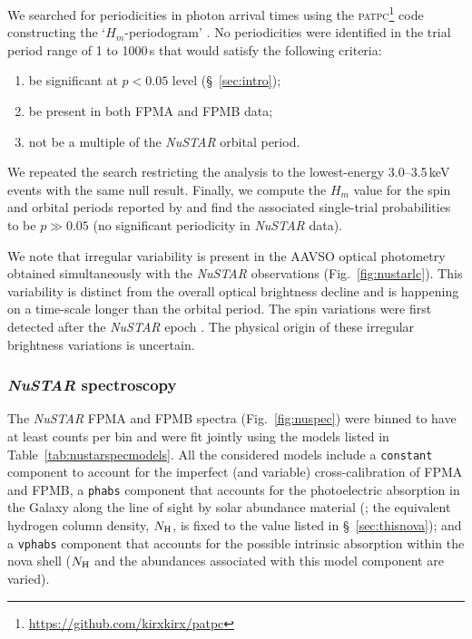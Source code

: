 \documentclass[a4paper,fleqn,usenatbib]{mnras}
\begin{document}
We searched for periodicities in photon arrival times using 
the \textsc{patpc}\footnote{\url{https://github.com/kirxkirx/patpc}} code 
\citep{2022arXiv220610625S} constructing the `$H_m$-periodogram' 
\citep{1989A&A...221..180D,2010A&A...517L...9D,2011ApJ...732...38K}.
No periodicities were identified in the trial period range of 1 to 1000\,s
that would satisfy the following criteria:
\begin{enumerate}
\item be significant at $p<0.05$ level (\S~\ref{sec:intro});
\item be present in both FPMA and FPMB data;
\item not be a multiple of the {\em NuSTAR} orbital period.
\end{enumerate}
We repeated the search restricting the analysis to the lowest-energy
3.0--3.5\,keV events with the same null result. 
Finally, we compute the 
$H_m$ value for the spin and orbital periods reported by \cite{2022ApJ...940L..56P} and
find the associated single-trial probabilities to be $p \gg 0.05$ 
(no significant periodicity in {\em NuSTAR} data).

We note that irregular variability is present
in the AAVSO optical photometry obtained simultaneously with the {\em NuSTAR}
observations (Fig.~\ref{fig:nustarlc}). 
This variability is distinct from the overall optical brightness decline 
and is happening on a time-scale longer than the orbital period. 
The spin variations were first detected after the {\em NuSTAR} epoch \citep{2022ApJ...940L..56P}. 
The physical origin of these irregular brightness variations is uncertain.


\subsubsection{{\em NuSTAR} spectroscopy}
\label{sec:nustarspec}



The {\em NuSTAR} FPMA and FPMB spectra (Fig.~\ref{fig:nuspec}) were binned to
have at least \nustargroupmincounts{} counts per bin and were fit jointly
using the models listed in Table~\ref{tab:nustarspecmodels}.
All the considered models include a \texttt{constant} component to account for
the imperfect (and variable) cross-calibration of FPMA and FPMB, a \texttt{phabs} component
that accounts for the photoelectric absorption \citep{1992ApJ...400..699B} in the Galaxy along the line 
of sight by solar abundance material (\citealt{2009ARA&A..47..481A}; the equivalent hydrogen column
density, $N_{\rm H}$, is fixed to the value listed in \S~\ref{sec:thisnova}); and a
\texttt{vphabs} component that accounts for the possible intrinsic absorption within the nova shell 
($N_{\rm H}$ and the abundances associated with this model component are varied).
\end{document}
